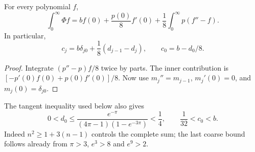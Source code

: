 \begin{proposition}
For every polynomial \(f\),
\begin{equation}
 \int_0^\infty\Phi f
 =b f(0)+\frac{p(0)}8f'(0)
   +\frac18\int_0^\infty p(f''-f).
 \label{eq:green-transfer}
\end{equation}
In particular,
\begin{equation}
 c_j=b\delta_{j0}+\frac18(d_{j-1}-d_j),\qquad
 c_0=b-d_0/8.
 \label{eq:green-coefficients}
\end{equation}
\end{proposition}
\begin{proof}
Integrate \((p''-p)f/8\) twice by parts.  The inner contribution is
\([-p'(0)f(0)+p(0)f'(0)]/8\).  Now use
\(m_j''=m_{j-1}\), \(m_j'(0)=0\), and \(m_j(0)=\delta_{j0}\).
\end{proof}
The tangent inequality used below also gives
\begin{equation}
 0<d_0\le\frac{e^{-\pi}}{(4\pi-1)(1-e^{-3\pi})}<\frac14,
 \qquad \frac1{32}<c_0<b.
\end{equation}
Indeed \(n^2\ge1+3(n-1)\) controls the complete sum; the last coarse
bound follows already from \(\pi>3\), \(e^3>8\) and \(e^9>2\).

